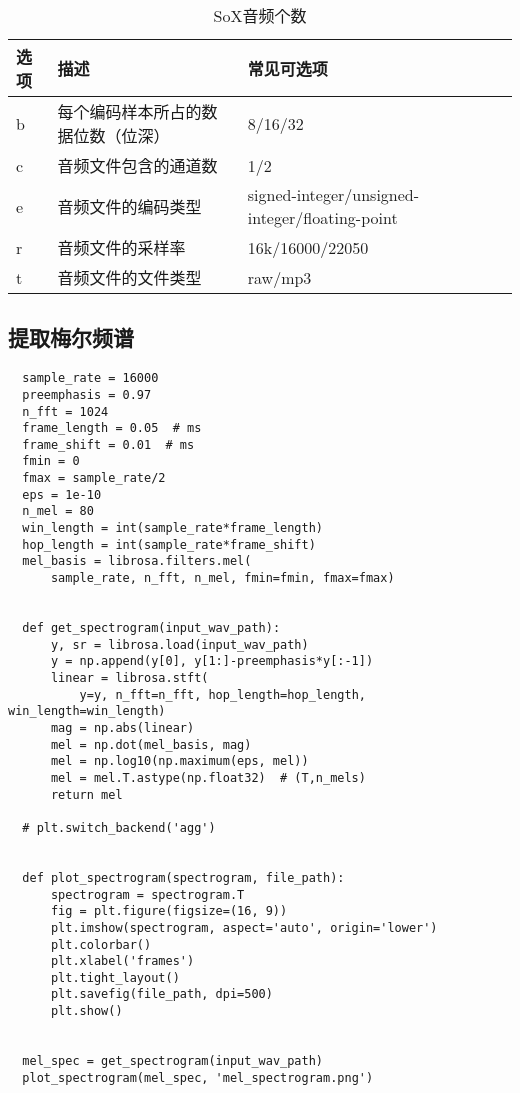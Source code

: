 \documentclass[cn,10pt,math=newtx,citestyle=gb7714-2015,bibstyle=gb7714-2015]{elegantbook}
\begin{document}
\begin{table}[htbp]
  \centering
  \caption{SoX音频个数}
    \begin{tabular}{llll}
    \toprule
    选项 & 描述 & 常见可选项 \\
    \midrule
    b & 每个编码样本所占的数据位数（位深） & 8/16/32 \\
    c & 音频文件包含的通道数 & 1/2 \\
    e & 音频文件的编码类型 & signed-integer/unsigned-integer/floating-point \\
    r & 音频文件的采样率 & 16k/16000/22050 \\
    t & 音频文件的文件类型 & raw/mp3 \\
    \bottomrule
    \end{tabular}%
\end{table}%

\subsection{提取梅尔频谱}

\begin{lstlisting}
  sample_rate = 16000
  preemphasis = 0.97
  n_fft = 1024
  frame_length = 0.05  # ms
  frame_shift = 0.01  # ms
  fmin = 0
  fmax = sample_rate/2
  eps = 1e-10
  n_mel = 80
  win_length = int(sample_rate*frame_length)
  hop_length = int(sample_rate*frame_shift)
  mel_basis = librosa.filters.mel(
      sample_rate, n_fft, n_mel, fmin=fmin, fmax=fmax)
  
  
  def get_spectrogram(input_wav_path):
      y, sr = librosa.load(input_wav_path)
      y = np.append(y[0], y[1:]-preemphasis*y[:-1])
      linear = librosa.stft(
          y=y, n_fft=n_fft, hop_length=hop_length, win_length=win_length)
      mag = np.abs(linear)
      mel = np.dot(mel_basis, mag)
      mel = np.log10(np.maximum(eps, mel))
      mel = mel.T.astype(np.float32)  # (T,n_mels)
      return mel
  
  # plt.switch_backend('agg')
  
  
  def plot_spectrogram(spectrogram, file_path):
      spectrogram = spectrogram.T
      fig = plt.figure(figsize=(16, 9))
      plt.imshow(spectrogram, aspect='auto', origin='lower')
      plt.colorbar()
      plt.xlabel('frames')
      plt.tight_layout()
      plt.savefig(file_path, dpi=500)
      plt.show()
  
  
  mel_spec = get_spectrogram(input_wav_path)
  plot_spectrogram(mel_spec, 'mel_spectrogram.png')
\end{lstlisting}
\end{document}
